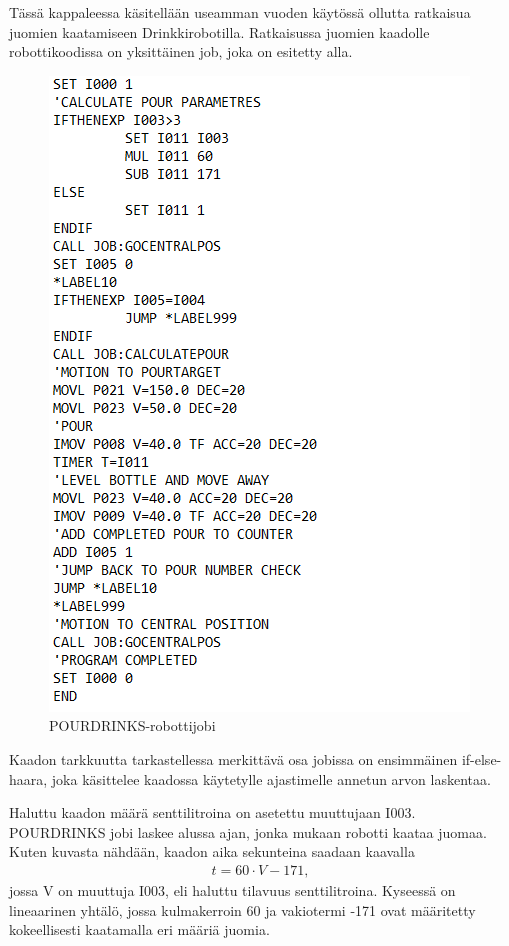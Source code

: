 Tässä kappaleessa käsitellään useamman vuoden käytössä ollutta ratkaisua juomien kaatamiseen Drinkkirobotilla. Ratkaisussa juomien kaadolle robottikoodissa on yksittäinen job, joka on esitetty alla.

\begin{figure}[h]
\begin{center}
\includegraphics[scale=0.8]{img/POURDRINKS.png}
\end{center}
\caption{POURDRINKS-robottijobi}
\label{fig:pourdrinks}
\end{figure}

%

Kaadon tarkkuutta tarkastellessa merkittävä osa jobissa on ensimmäinen if-else-haara, joka käsittelee kaadossa käytetylle ajastimelle annetun arvon laskentaa.

Haluttu kaadon määrä senttilitroina on asetettu muuttujaan I003. POURDRINKS jobi laskee alussa ajan, jonka mukaan robotti kaataa juomaa. Kuten kuvasta nähdään, kaadon aika sekunteina saadaan kaavalla
\begin{align}
   t = 60 \cdot V - 171 \mathrm{,}
\end{align}
jossa V on muuttuja I003, eli haluttu tilavuus senttilitroina. Kyseessä on lineaarinen yhtälö, jossa kulmakerroin 60 ja vakiotermi -171 ovat määritetty kokeellisesti kaatamalla eri määriä juomia.


